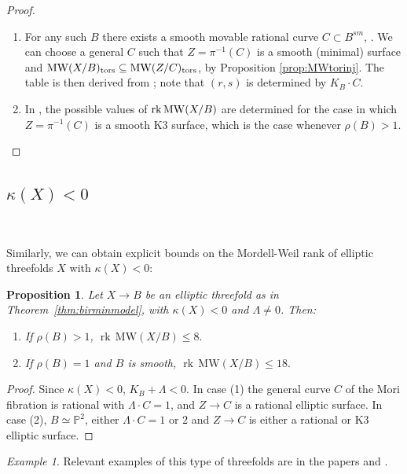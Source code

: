\documentclass[11pt]{amsart}
\newtheorem{proposition}[theorem]{Proposition}
\theoremstyle{definition}
\theoremstyle{definition}
\theoremstyle{remark}
\theoremstyle{remark}
\newtheorem{example}[theorem]{Example}
\theoremstyle{definition}
\theoremstyle{conjecture}
\newcommand{\MW}{\mathrm{MW}}
\begin{document}
\begin{proof}
\begin{enumerate}
    \item For any such $B$ there exists a smooth  movable rational curve $C \subset B^{sm}$,   \cite{XuSRC2012}. We can choose a general $C$ such that $Z= \pi ^{-1}(C)$  is a smooth (minimal)  surface and 
$\MW(X/B)_{\rm tors}  \subseteq \MW(Z/C)_{\rm tors}  $, by Proposition  \ref{prop:MWtorinj}.  The table is  then derived  from \cite[Lemma1.1, Table 4.5]{MirandaPersson1989}; note that $(r,s)$ is determined by $K_B \cdot C$.
\item In \cite{Shimada2000}, the possible values of ${\rm rk\,MW}(X/B)$ are determined for the case in which \(Z=\pi^{-1}(C)\) is a smooth K3 surface, which is the case whenever \(\rho(B)>1\).
\end{enumerate}\end{proof}
\medskip


\subsection{$\kappa(X)<0$}~
\medskip

 Similarly, we can  obtain explicit bounds on the Mordell-Weil rank of elliptic threefolds  $X$ with 
$\kappa(X) <0 $:

\begin{proposition}\label{prop:KodNeg}
Let \( X \to B \) be an elliptic threefold as in Theorem~\ref{thm:birminmodel}, with \( \kappa(X)<0 \) and \( \Lambda \neq 0 \). Then:
\begin{enumerate}
    \item If \( \rho(B)>1 \),
   $ 
    \operatorname{rk}\,\MW(X/B) \leq 8.$
  \item  If  \( \rho(B)=1 \)  and $B$ is smooth,  $\operatorname{rk}\,\MW(X/B) \leq 18.$
\end{enumerate} 
\end{proposition}
\begin{proof}  Since $\kappa(X)<0$, $K_B+ \Lambda <0$. In case (1) the general  curve $C$  of the Mori fibration is rational with $\Lambda \cdot C=1$, and $Z \to C$ is a rational elliptic surface. In case (2), $B \simeq \mathbb{P}^2$,  either $\Lambda \cdot C=1$ or $2$ and $Z \to C$ is  either a rational  or K3 elliptic surface. \end{proof}

\begin{example}\label{ex:K<0} %
Relevant  examples  of this type of threefolds are  in the papers \cite{Totaro2008} and \cite{PrendergastSmith2012}.
\end{example}
\end{document}
